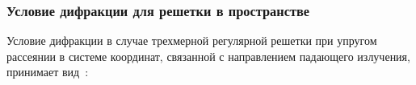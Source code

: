 \subsubsection{Условие дифракции для решетки в пространстве}


Условие дифракции в случае трехмерной регулярной решетки при упругом рассеянии в системе координат, связанной с направлением падающего излучения, принимает вид~\cite{Kittel86}:



